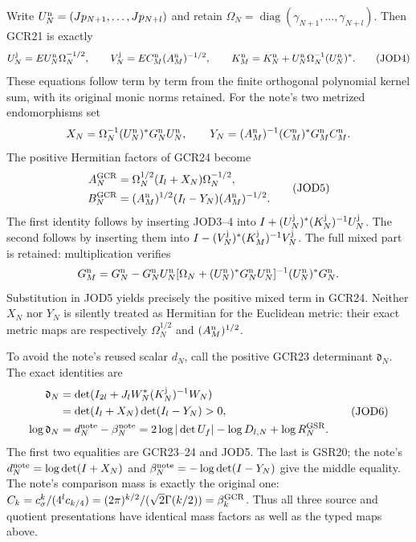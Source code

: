 Write $U_N^{\rm n}=(Jp_{N+1},\ldots,Jp_{N+l})$ and retain
$\Omega_N=\operatorname{diag}(\gamma_{N+1},\ldots,\gamma_{N+l})$.
Then GCR21 is exactly
\[
 U_N^{\rm j}=EU_N^{\rm n}\Omega_N^{-1/2},\qquad
 V_N^{\rm j}=EC_M^{\rm n}(A_M^{\rm n})^{-1/2},\qquad
 K_M^{\rm n}=K_N^{\rm n}
       +U_N^{\rm n}\Omega_N^{-1}(U_N^{\rm n})^*.
 \tag{JOD4}
\]
These equations follow term by term from the finite orthogonal
polynomial kernel sum, with its original monic norms retained.
For the note's two metrized endomorphisms set
\[
 X_N=\Omega_N^{-1}(U_N^{\rm n})^*G_N^{\rm n}U_N^{\rm n},\qquad
 Y_N=(A_M^{\rm n})^{-1}(C_M^{\rm n})^*G_M^{\rm n}C_M^{\rm n}.
\]
The positive Hermitian factors of GCR24 become
\[
\begin{aligned}
 A_N^{\rm GCR}
   &=\Omega_N^{1/2}(I_l+X_N)\Omega_N^{-1/2},\\
 B_N^{\rm GCR}
   &=(A_M^{\rm n})^{1/2}(I_l-Y_N)(A_M^{\rm n})^{-1/2}.
\end{aligned}\tag{JOD5}
\]
The first identity follows by inserting JOD3--4 into
$I+(U_N^{\rm j})^*(K_N^{\rm j})^{-1}U_N^{\rm j}$.
The second follows by inserting them into
$I-(V_N^{\rm j})^*(K_M^{\rm j})^{-1}V_N^{\rm j}$.
The full mixed part is retained: multiplication verifies
\[
 G_M^{\rm n}=G_N^{\rm n}-G_N^{\rm n}U_N^{\rm n}
 [\Omega_N+(U_N^{\rm n})^*G_N^{\rm n}U_N^{\rm n}]^{-1}
 (U_N^{\rm n})^*G_N^{\rm n}.
\]
Substitution in JOD5 yields precisely the positive mixed term
in GCR24. Neither $X_N$ nor $Y_N$ is silently treated as
Hermitian for the Euclidean metric: their exact metric maps
are respectively $\Omega_N^{1/2}$ and $(A_M^{\rm n})^{1/2}$.

To avoid the note's reused scalar $d_N$, call the positive
GCR23 determinant $\mathfrak d_N$. The exact identities are
\[
\begin{aligned}
 \mathfrak d_N
 &=\det(I_{2l}+J_lW_N^*(K_N^{\rm j})^{-1}W_N)\\
 &=\det(I_l+X_N)\det(I_l-Y_N)>0,\\
 \log\mathfrak d_N&=d_N^{\rm note}-\beta_N^{\rm note}
  =2\log|\det U_f|-\log D_{l,N}+\log R_N^{\rm GSR}.
\end{aligned}\tag{JOD6}
\]
The first two equalities are GCR23--24 and JOD5. The last is
GSR20; the note's $d_N^{\rm note}=\log\det(I+X_N)$ and
$\beta_N^{\rm note}=-\log\det(I-Y_N)$ give the middle equality.
The note's comparison mass is exactly the original one:
$C_k=c_\sigma^k/(4^lc_{k/4})
=(2\pi)^{k/2}/(\sqrt2\Gamma(k/2))=\beta_k^{\rm GCR}$.
Thus all three source and quotient presentations have identical
mass factors as well as the typed maps above.

